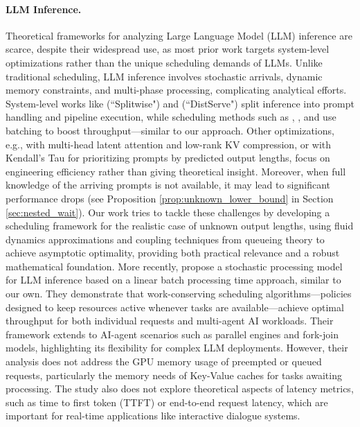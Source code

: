 \paragraph*{LLM Inference.} 
Theoretical frameworks for analyzing Large Language Model (LLM) inference are scarce, despite their widespread use, as most prior work targets system-level optimizations rather than the unique scheduling demands of LLMs. Unlike traditional scheduling, LLM inference involves stochastic arrivals, dynamic memory constraints, and multi-phase processing, complicating analytical efforts. System-level works like \cite{patel2023peeling} (``Splitwise") and \cite{zhong2024distserve} (``DistServe") split inference into prompt handling and pipeline execution, while scheduling methods such as \cite{yu2022orca}, \cite{agrawal2023sarathi}, and \cite{agrawal2024taming} use batching to boost throughput—similar to our approach. Other optimizations, e.g., \cite{deepseekai2024deepseekv2strongeconomicalefficient} with multi-head latent attention and low-rank KV compression, or \cite{fu2025efficient} with Kendall’s Tau for prioritizing prompts by predicted output lengths, focus on engineering efficiency rather than giving theoretical insight. 
Moreover, when full knowledge of the arriving prompts is not available, it may lead to significant performance drops (see Proposition \ref{prop:unknown_lower_bound} in Section \ref{sec:nested_wait}). Our work tries to tackle these challenges by developing a scheduling framework for the realistic case of unknown output lengths, using fluid dynamics approximations and coupling techniques from queueing theory to achieve asymptotic optimality, providing both practical relevance and a robust mathematical foundation. More recently, \cite{li2025throughput} propose a stochastic processing model for LLM inference based on a linear batch processing time approach, similar to our own. They demonstrate that work-conserving scheduling algorithms—policies designed to keep resources active whenever tasks are available—achieve optimal throughput for both individual requests and multi-agent AI workloads. Their framework extends to AI-agent scenarios such as parallel engines and fork-join models, highlighting its flexibility for complex LLM deployments. However, their analysis does not address the GPU memory usage of preempted or queued requests, particularly the memory needs of Key-Value caches for tasks awaiting processing. The study also does not explore theoretical aspects of latency metrics, such as time to first token (TTFT) or end-to-end request latency, which are important for real-time applications like interactive dialogue systems.


